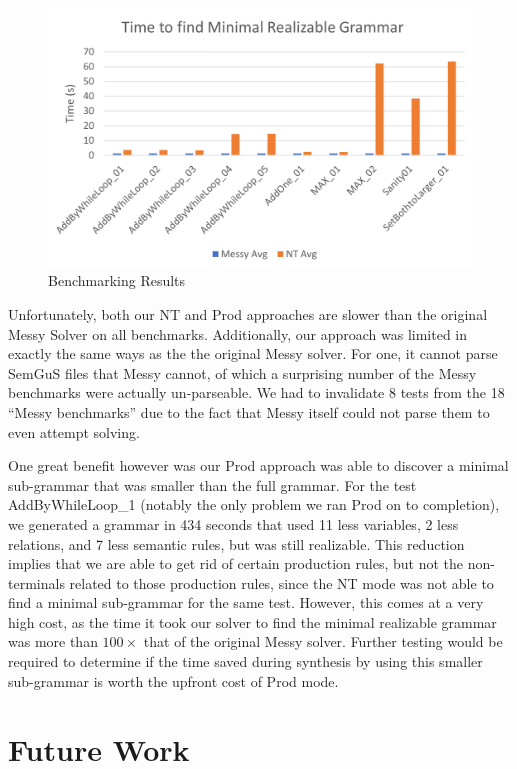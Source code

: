 \documentclass[acmsmall, nonacm]{acmart}
\begin{document}
\begin{figure}[H]
  \centering
  \includegraphics[width=1\textwidth]{Results.png}
  \caption{Benchmarking Results}
  \label{fig:Benchmarking-Results}
\end{figure}

Unfortunately, both our NT and Prod approaches are slower than the original Messy Solver on all benchmarks.
Additionally, our approach was limited in exactly the same ways as the the original Messy solver. For one, it cannot parse SemGuS files that Messy cannot, of which a surprising number of the Messy benchmarks were actually un-parseable.
We had to invalidate 8 tests from the 18 “Messy benchmarks” due to the fact that Messy itself could not parse them to even attempt solving.

One great benefit however was our Prod approach was able to discover a minimal sub-grammar that was smaller than the full grammar. For the test AddByWhileLoop_1 (notably the only problem we ran Prod on to completion), we
generated a grammar in 434 seconds that used 11 less variables, 2 less relations, and 7 less semantic rules, but was still realizable.
This reduction implies that we are able to get rid of certain production rules, but not the non-terminals related to those production rules, since
the NT mode was not able to find a minimal sub-grammar for the same test.
However, this comes at a very high cost, as the time it took our solver to find the minimal realizable grammar was more than $100 \times$ that of the original Messy solver. Further testing would be required to determine if the time saved during synthesis by using this smaller sub-grammar is worth the upfront cost of Prod mode.

\section{Future Work}
\end{document}

